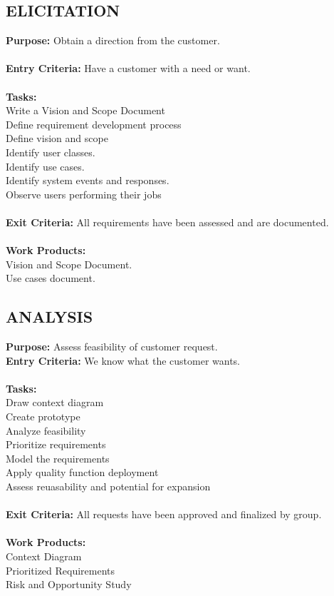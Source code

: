 \documentclass[11pt]{article}
\begin{document}
\subsection{ELICITATION}
\textbf{Purpose:} Obtain a direction from the customer.\\
\\
\textbf{Entry Criteria: }Have a customer with a need or want.\\
\\
\textbf{Tasks:} \\
Write a Vision and Scope Document \\
Define requirement development process\\
Define vision and scope\\
Identify user classes. \\
Identify use cases. \\
Identify system events and responses. \\
Observe users performing their jobs\\
\\
\textbf{Exit Criteria:} All requirements have been assessed and are documented.\\
\\
\textbf{Work Products:} \\
Vision and Scope Document.\\
Use cases document.\\

\subsection{ANALYSIS}
\textbf{Purpose:} Assess feasibility of customer request. \\
\textbf{Entry Criteria:} We know what the customer wants. \\
\\
\textbf{Tasks:} \\
Draw context diagram \\
Create prototype \\
Analyze feasibility \\
Prioritize requirements \\
Model the requirements \\
Apply quality function deployment \\
Assess reuasability and potential for expansion \\
\\
\textbf{Exit Criteria:}  All requests have been approved and finalized by group. \\
\\
\textbf{Work Products:} \\
Context Diagram \\
Prioritized Requirements \\
Risk and Opportunity Study \\
\end{document}
